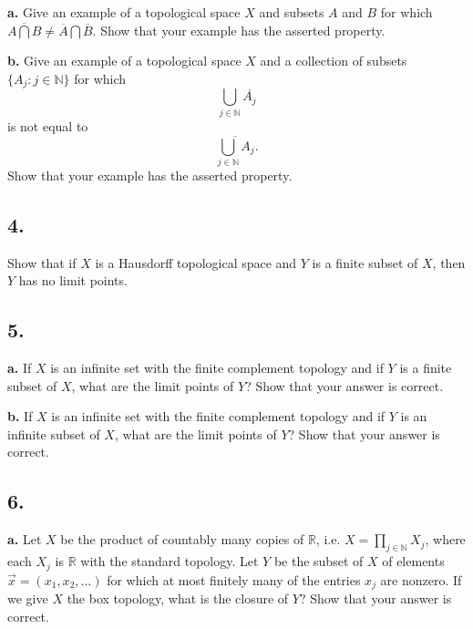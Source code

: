 \documentclass{amsart}
\theoremstyle{plain}
\theoremstyle{definition}
\theoremstyle{remark}
\begin{document}
\vspace{.1in}
{\bfseries a.} Give an example of a topological space $X$ and subsets $A$ and $B$ for which $\overline{A\bigcap B} \ne \overline{A} \bigcap \overline{B}$. Show that your example has the asserted property. 

\vspace{.1in}
{\bfseries b.} Give an example of a topological space $X$ and a collection of subsets $\{ A_j : j\in \mathbb N \}$ for which 
\[
\bigcup _{j\in \mathbb N } \overline{A_j}
\]
is not equal to 
\[
\overline{\bigcup _{j\in \mathbb N } A_j}.
\]
Show that your example has the asserted property. 

\vspace{.15in}

\noindent
\subsection*{4.}  Show that if $X$ is a Hausdorff topological space and $Y$ is a finite subset of $X$, then $Y$ has no limit points. 





\vspace{.15in}

\noindent
\subsection*{5.} 

{\bfseries a.} If $X$ is an infinite set with the finite complement topology and if $Y$ is a finite subset of $X$, what are the limit points of $Y$? Show that your answer is correct. 


\vspace{.1in}
{\bfseries b.} If $X$ is an infinite set with the finite complement topology and if $Y$ is an infinite subset of $X$, what are the limit points of $Y$? Show that your answer is correct. 




\vspace{.15in}

\noindent
\subsection*{6.} 

{\bfseries a.} Let $X$ be the product of countably many copies of $\mathbb R$, i.e. $X = \prod _{j\in \mathbb N } X_j$, where each $X_j$ is $\mathbb R$ with the standard topology. Let $Y$ be the subset of $X$ of elements $\vec{x} = ( x_1 , x_2 , . . . )$ for which at most finitely many of the entries $x_j$ are nonzero. If we give $X$ the box topology, what is the closure of $Y$? Show that your answer is correct. 
\end{document}
